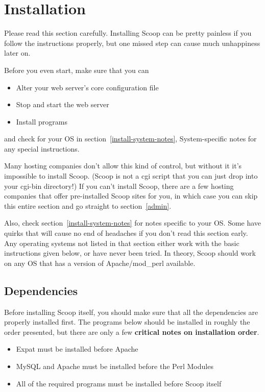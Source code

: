 \section{Installation}
\label{install}

Please read this section carefully. Installing Scoop can be pretty painless if you follow the instructions properly, but one missed step can cause much unhappiness later on.

Before you even start, make sure that you can 
\begin{itemize}
\item Alter your web server's core configuration file
\item Stop and start the web server
\item Install programs
\end{itemize}
and check for your OS in section~\ref{install-system-notes}, System-specific notes for any special instructions.

Many hosting companies don't allow this kind of control, but without it it's impossible to install Scoop.  (Scoop is not a cgi script that you can just drop into your cgi-bin directory!)  If you can't install Scoop, there are a few hosting companies that offer pre-installed Scoop sites for you, in which case you can skip this entire section and go straight to section~\ref{admin}.

Also, check section~\ref{install-system-notes} for notes specific to your OS.  Some have quirks that will cause no end of headaches if you don't read this section early.  Any operating systems not listed in that section either work with the basic instructions given below, or have never been tried.  In theory, Scoop should work on any OS that has a version of Apache/mod\_perl available.

\subsection{Dependencies}
\label{install-depend}

Before installing Scoop itself, you should make sure that all the dependencies are properly installed first.  The programs below should be installed in roughly the order presented, but there are only a few {\bf critical notes on installation order}.  
\begin{itemize}
\item Expat must be installed before Apache
\item MySQL and Apache must be installed before the Perl Modules
\item All of the required programs must be installed before Scoop itself
\end{itemize}

